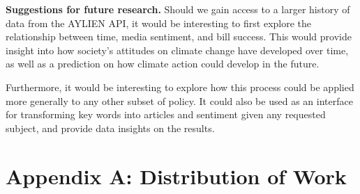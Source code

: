 \documentclass[letterpaper,11pt]{article}
\begin{document}
\textbf{Suggestions for future research.}
Should we gain access to a larger history of data from the AYLIEN API, it would be interesting to first explore the relationship between time, media sentiment, and bill success. This would provide insight into how society's attitudes on climate change have developed over time, as well as a prediction on how climate action could develop in the future. 

Furthermore, it would be interesting to explore how this process could be applied more generally to any other subset of policy. It could also be used as an interface for transforming key words into articles and sentiment given any requested subject, and provide data insights on the results. 


\clearpage

\section*{Appendix A: Distribution of Work}

\vspace{.1in}
\end{document}
